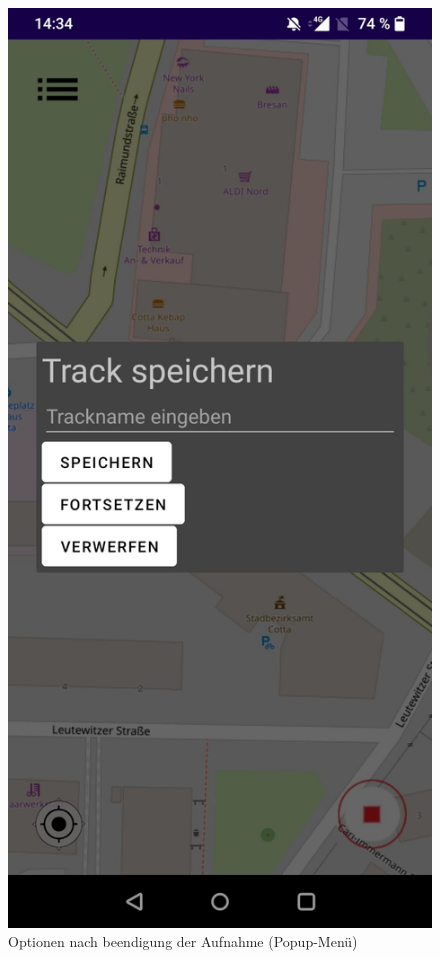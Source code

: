 \documentclass{article}
\begin{document}
\begin{enumerate}
\begin{figure}[H]
		\includegraphics[scale=0.2]{16_AufnahmeMenue.jpg}
		\centering
		\caption{ Optionen nach beendigung der Aufnahme (Popup-Menü)}
	\end{figure}
\end{enumerate}
\end{document}
